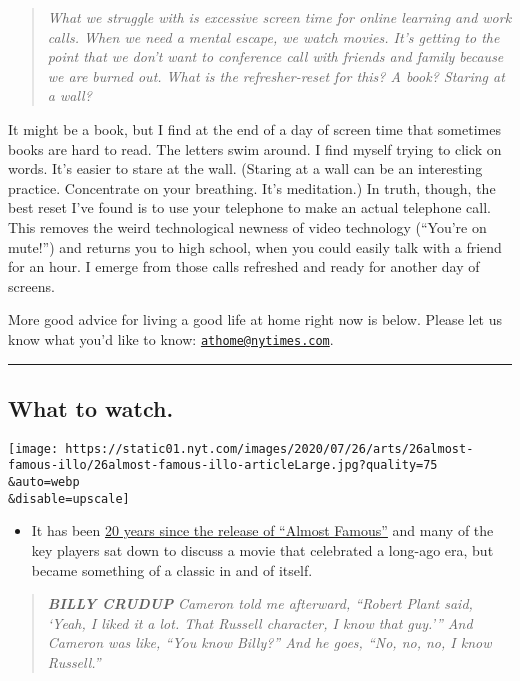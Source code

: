 \begin{quote}
\emph{What we struggle with is excessive screen time for online learning
and work calls. When we need a mental escape, we watch movies. It's
getting to the point that we don't want to conference call with friends
and family because we are burned out. What is the refresher-reset for
this? A book? Staring at a wall?}
\end{quote}

It might be a book, but I find at the end of a day of screen time that
sometimes books are hard to read. The letters swim around. I find myself
trying to click on words. It's easier to stare at the wall. (Staring at
a wall can be an interesting practice. Concentrate on your breathing.
It's meditation.) In truth, though, the best reset I've found is to use
your telephone to make an actual telephone call. This removes the weird
technological newness of video technology (``You're on mute!'') and
returns you to high school, when you could easily talk with a friend for
an hour. I emerge from those calls refreshed and ready for another day
of screens.

More good advice for living a good life at home right now is below.
Please let us know what you'd like to know:
\href{mailto:athome@nytimes.com}{\nolinkurl{athome@nytimes.com}}.

\begin{center}\rule{0.5\linewidth}{\linethickness}\end{center}

\hypertarget{what-to-watch}{%
\subsection{What to watch.}\label{what-to-watch}}

\texttt{[image: https://static01.nyt.com/images/2020/07/26/arts/26almost-famous-illo/26almost-famous-illo-articleLarge.jpg?quality=75\\\&auto=webp\\\&disable=upscale]}

\begin{itemize}
\tightlist
\item
  It has been
  \href{https://www.nytimes.com/2020/07/23/movies/almost-famous-anniversary-golden-god-scene.html}{20
  years since the release of ``Almost Famous''} and many of the key
  players sat down to discuss a movie that celebrated a long-ago era,
  but became something of a classic in and of itself.
\end{itemize}

\begin{quote}
\emph{\textbf{BILLY CRUDUP}} \emph{Cameron told me afterward, ``Robert
Plant said, `Yeah, I liked it a lot. That Russell character, I know that
guy.''' And Cameron was like, ``You know Billy?'' And he goes, ``No, no,
no, I know Russell.''}
\end{quote}

